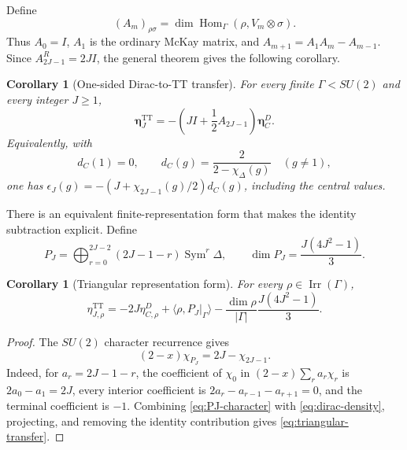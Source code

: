 \documentclass[11pt]{article}
\newtheorem{corollary}[theorem]{Corollary}
\theoremstyle{definition}
\DeclareMathOperator{\Sym}{Sym}
\DeclareMathOperator{\Hom}{Hom}
\newcommand{\TT}{\mathrm{TT}}
\newcommand{\Irr}{\operatorname{Irr}}
\begin{document}
Define
\begin{equation}
 (A_m)_{\rho\sigma}
 =\dim\Hom_\Gamma(\rho,V_m\otimes\sigma).
 \label{eq:generalized-mckay}
\end{equation}
Thus $A_0=I$, $A_1$ is the ordinary McKay matrix, and
$A_{m+1}=A_1A_m-A_{m-1}$.  Since $A^R_{2J-1}=2JI$, the general theorem gives
the following corollary.

\begin{corollary}[One-sided Dirac-to-TT transfer]
\label{cor:one-sided-transfer}
For every finite $\Gamma< SU(2)$ and every integer $J\geq1$,
\begin{equation}
 \boxed{
 \boldsymbol\eta^{\TT}_J
 =-\left(JI+\frac12A_{2J-1}\right)
 \boldsymbol\eta^D_C.}
 \label{eq:transfer}
\end{equation}
Equivalently, with
\begin{equation}
 d_C(1)=0,
 \qquad
 d_C(g)=\frac{2}{2-\chi_\Delta(g)}\quad(g\ne1),
 \label{eq:dirac-density}
\end{equation}
one has
$\epsilon_J(g)=-(J+\chi_{2J-1}(g)/2)d_C(g)$, including the central values.
\end{corollary}

There is an equivalent finite-representation form that makes the identity
subtraction explicit.  Define
\begin{equation}
 P_J=\bigoplus_{r=0}^{2J-2}(2J-1-r)\Sym^r\Delta,
 \qquad
 \dim P_J=\frac{J(4J^2-1)}3.
 \label{eq:PJ}
\end{equation}

\begin{corollary}[Triangular representation form]
\label{cor:triangular}
For every $\rho\in\Irr(\Gamma)$,
\begin{equation}
 \boxed{
 \eta^{\TT}_{J,\rho}
 =-2J\eta^D_{C,\rho}
 +\langle\rho,P_J|_\Gamma\rangle
 -\frac{\dim\rho}{|\Gamma|}\frac{J(4J^2-1)}3.}
 \label{eq:triangular-transfer}
\end{equation}
\end{corollary}

\begin{proof}
The $SU(2)$ character recurrence gives
\begin{equation}
 (2-x)\chi_{P_J}=2J-\chi_{2J-1}.
 \label{eq:PJ-character}
\end{equation}
Indeed, for $a_r=2J-1-r$, the coefficient of $\chi_0$ in
$(2-x)\sum_ra_r\chi_r$ is $2a_0-a_1=2J$, every interior coefficient is
$2a_r-a_{r-1}-a_{r+1}=0$, and the terminal coefficient is $-1$.
Combining \eqref{eq:PJ-character} with \eqref{eq:dirac-density}, projecting,
and removing the identity contribution gives
\eqref{eq:triangular-transfer}.
\end{proof}
\end{document}

